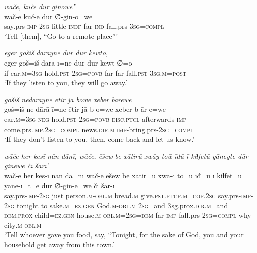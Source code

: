 \ea \label{BP.162}
\textit{wāče, kučē dūr ginowe”} \\ 
\gll wāč-e kuč-ē dūr ∅-gin-o=we \\ 
 say.prs-\textsc{imp-}\textsc{2sg} little\textsc{-indf} far \textsc{ind-}fall.prs\textsc{-3sg}\textsc{=compl} \\ 
\glt `Tell [them], “Go to a remote place”'
\z 
 
\ea \label{BP.163}
\textit{eger gošiš dārāyne dūr dūr kewto,} \\ 
\gll eger goš=iš dārā-ī=ne dūr dūr kewt-∅=o \\ 
 if ear\textsc{.m}\textsc{=3sg} hold\textsc{.pst}-\textsc{2sg}\textsc{=\textsc{povb}} far far fall\textsc{.pst}\textsc{-3sg}\textsc{.m}\textsc{=\textsc{post}} \\ 
\glt `If they listen to you, they will go away.'
\z 
 
\ea \label{BP.164}
\textit{gošiš nedārāyne ētir jā bowe xeber bārewe} \\ 
\gll goš=iš ne-dārā-ī=ne ētir jā b-o=we xeber b-ār-e=we \\ 
 ear\textsc{.m}\textsc{=3sg} \textsc{neg-}hold\textsc{.pst}-\textsc{2sg}\textsc{=\textsc{povb}} \textsc{disc.ptcl} afterwards \textsc{imp-}come.prs\textsc{.imp}\textsc{.\textsc{2sg}}\textsc{=compl} news\textsc{.dir}\textsc{.m} \textsc{imp-}bring.prs-\textsc{2sg}\textsc{=compl} \\ 
\glt `If they don’t listen to you, then, come back and let us know.'
\z 
 
\ea \label{BP.165}
\textit{wāče her kesī nān dānī, wāče, ēšew be xātirū xwāy toū īđū ī kiɫfetū yāneyte dūr ginewe čī šārī’} \\ 
\gll wāč-e her kes-ī nān dā=nī wāč-e ēšew be xātir=ū xwā-ī to=ū īđ=ū ī kiɫfet=ū yāne-ī=t=e dūr ∅-gin-e=we čī šār-ī \\ 
 say.prs-\textsc{imp-}\textsc{2sg} just person\textsc{.m}\textsc{-obl}\textsc{.m} bread\textsc{.m} give\textsc{.pst}\textsc{.ptcp}\textsc{.m}\textsc{=cop}\textsc{.\textsc{2sg}} say.prs-\textsc{imp-}\textsc{2sg} tonight to sake\textsc{.m}\textsc{=ez.gen} God\textsc{.m}\textsc{-obl}\textsc{.m} \textsc{2sg}=and 3sg.prox\textsc{.dir}\textsc{.m}=and \textsc{dem.prox} child\textsc{=ez.gen} house\textsc{.m}\textsc{-obl}\textsc{.m}\textsc{=\textsc{2sg}}\textsc{=dem} far \textsc{imp-}fall.prs-\textsc{2sg}\textsc{=compl} why city\textsc{.m}\textsc{-obl}\textsc{.m} \\ 
\glt `Tell whoever gave you food, say, “Tonight, for the sake of God, you and your household get away from this town.'
\z 
 
